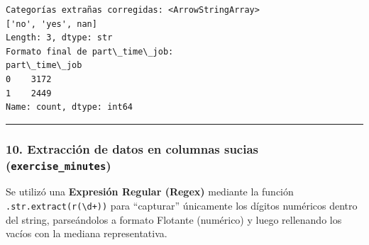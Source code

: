 \documentclass[11pt]{article}
\begin{document}
    \begin{Verbatim}[commandchars=\\\{\}]
Categorías extrañas corregidas: <ArrowStringArray>
['no', 'yes', nan]
Length: 3, dtype: str
Formato final de part\_time\_job:
part\_time\_job
0    3172
1    2449
Name: count, dtype: int64
    \end{Verbatim}

    \begin{center}\rule{0.5\linewidth}{0.5pt}\end{center}

\subsubsection{\texorpdfstring{10. Extracción de datos en columnas
sucias
(\texttt{exercise\_minutes})}{10. Extracción de datos en columnas sucias (exercise\_minutes)}}\label{extracciuxf3n-de-datos-en-columnas-sucias-exercise_minutes}

Se utilizó una \textbf{Expresión Regular (Regex)} mediante la función
\texttt{.str.extract(r\textquotesingle{}(\textbackslash{}d+)\textquotesingle{})}
para ``capturar'' únicamente los dígitos numéricos dentro del string,
parseándolos a formato Flotante (numérico) y luego rellenando los vacíos
con la mediana representativa.
\end{document}
